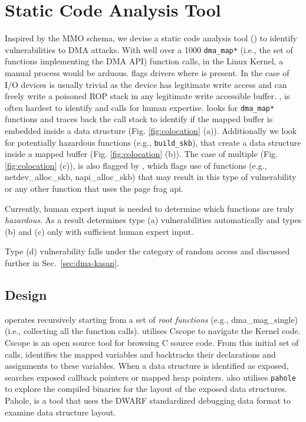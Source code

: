\section{Static Code Analysis Tool}\label{sec:static-analysis}

Inspired by the MMO schema, we devise a static code analysis tool (\tool) to identify vulnerabilities to DMA attacks. With well over a 1000 \texttt{dma\_map*} (i.e., the set of functions implementing the DMA API) function calls, in the Linux Kernel, a manual process would be arduous. \tool flags drivers where \oportunity{} is present. In the case of I/O devices \motivation{} is usually trivial as the device has legitimate write access and can freely write a poisoned ROP stack in any legitimate write accessible buffer. \means{}, is often hardest to identify and calls for human expertise. \tool looks for \texttt{dma\_map*} functions and traces back the call stack to identify if the mapped buffer is embedded inside a data structure (Fig. \ref{fig:colocation} (a)). Additionally we look for potentially hazardous functions (e.g., \texttt{build\_skb}), that create a data structure inside a mapped buffer (Fig. \ref{fig:colocation} (b)). 
The case of multiple \iova{} (Fig. \ref{fig:colocation} (c)), is also flagged by \tool, which flags use of functions (e.g., netdev\_alloc\_skb, napi\_alloc\_skb) that may result in this type of vulnerability or any other function that uses the page frag api. 

Currently, human expert input is needed to determine which functions are truly \emph{hazardous}. As a result \tool determines type (a) vulnerabilities automatically and types (b) and (c) only with sufficient human expert input. 


Type (d) vulnerability falls under the category of random access and discussed further in  Sec.~\ref{sec:dma-kasan}.

\subsection{Design}
\tool operates recursively starting from a set of \textit{root functions} (e.g., dma\_mag\_single) (i.e., collecting all the function calls). \tool utilises Cscope \cite{cscope,cscope_92} to navigate the Kernel code. Cscope is an open source tool for browsing C source code. From this initial set of calls, \tool identifies the mapped variables and backtracks their declarations and assignments to these variables. When a data structure is identified as exposed, \tool searches
exposed callback pointers or mapped heap pointers. \tool also utilises \texttt{pahole} \cite{dwarves} to explore the compiled binaries for the layout of the exposed data structures. Pahole, is a tool that uses the DWARF \cite{dwarf} standardized debugging data format to examine data structure layout.

